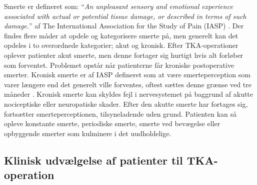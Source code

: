 Smerte er defineret som: “\textit{An unpleasant sensory and emotional experience associated with actual or potential tissue damage, or described in terms of such damage.}” af The International Association for the Study of Pain (IASP) \citep{Giangregorio1997} \citep{Carmon}.
Der findes flere måder at opdele og kategorisere smerte på, men generelt kan det opdeles i to overordnede kategorier; akut og kronisk. Efter TKA-operationer oplever patienter akut smerte, men denne fortager sig hurtigt hvis alt forløber som forventet. Problemet opstår når patienterne får kroniske postoperative smerter. Kronisk smerte er af IASP defineret som at være smerteperception som varer længere end det generelt ville forventes, oftest sættes denne grænse ved tre måneder \citep{Carmon}. Kronisk smerte kan skyldes fejl i nervesystemet på baggrund af akutte nociceptiske eller neuropatiske skader. Efter den akutte smerte har fortages sig, fortsætter smerteperceptionen, tilsyneladende uden grund. Patienten kan så opleve konstante smerte, periodiske smerte, smerte ved bevægelse eller opbyggende smerter som kulminere i det uudholdelige. \citep{Giangregorio1997}

\subsection{Klinisk udvælgelse af patienter til TKA-operation}

